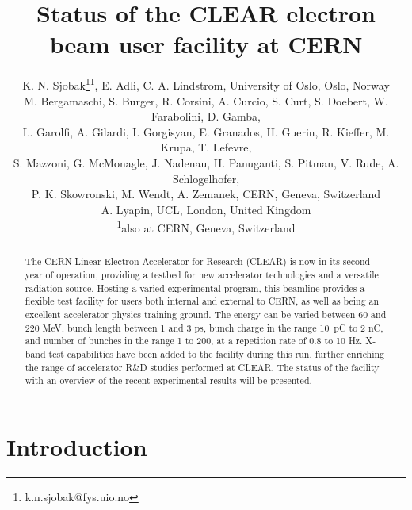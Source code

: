 \documentclass[a4paper,
               keeplastbox,   %
               ]{jacow}
\begin{document}
\title{Status of the CLEAR electron beam user facility at CERN}

\author{K. N. Sjobak\thanks{k.n.sjobak@fys.uio.no}\textsuperscript{1}, E. Adli, C. A. Lindstrom, University of Oslo, Oslo, Norway\\
  M. Bergamaschi, S. Burger, R. Corsini, A. Curcio, S. Curt, S. Doebert, W. Farabolini, D. Gamba,\\
  L. Garolfi, A. Gilardi, I. Gorgisyan, E. Granados, H. Guerin, R. Kieffer, M. Krupa, T. Lefevre,\\
  S. Mazzoni, G. McMonagle, J. Nadenau, H. Panuganti, S. Pitman, V. Rude, A. Schlogelhofer,\\
  P. K. Skowronski, M. Wendt, A. Zemanek, CERN, Geneva, Switzerland \\
  A. Lyapin, UCL, London, United Kingdom \\
  \textsuperscript{1}also at CERN, Geneva, Switzerland}

\maketitle

%
\begin{abstract}
  The CERN Linear Electron Accelerator for Research (CLEAR) is now in its second year of operation, providing a testbed for new accelerator technologies and a versatile radiation source.
  Hosting a varied experimental program, this beamline provides a flexible test facility for users both internal and external to CERN, as well as being an excellent accelerator physics training ground.
  The energy can be varied between 60 and 220 MeV, bunch length between 1 and 3 ps, bunch charge in the range 10~pC to 2 nC, and number of bunches in the range 1 to 200, at a repetition rate of 0.8 to 10 Hz.
  X-band test capabilities have been added to the facility during this run, further enriching the range of accelerator R\&D studies performed at CLEAR.
  The status of the facility with an overview of the recent experimental results will be presented.
\end{abstract}

\section{Introduction}
\end{document}
